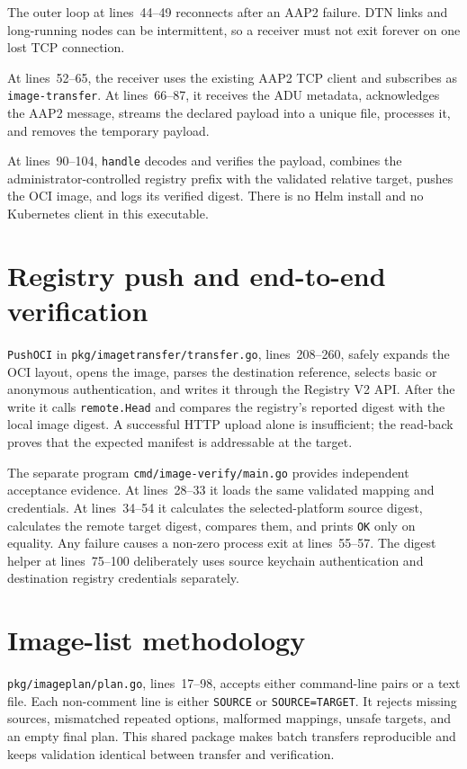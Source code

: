 \documentclass[11pt,a4paper]{article}
\newcommand{\file}[1]{\texttt{#1}}
\newcommand{\lines}[1]{lines~#1}
\begin{document}
The outer loop at \lines{44--49} reconnects after an AAP2 failure. DTN links
and long-running nodes can be intermittent, so a receiver must not exit forever
on one lost TCP connection.

At \lines{52--65}, the receiver uses the existing AAP2 TCP client and
subscribes as \file{image-transfer}. At \lines{66--87}, it receives the ADU
metadata, acknowledges the AAP2 message, streams the declared payload into a
unique file, processes it, and removes the temporary payload.

At \lines{90--104}, \file{handle} decodes and verifies the payload, combines
the administrator-controlled registry prefix with the validated relative
target, pushes the OCI image, and logs its verified digest. There is no Helm
install and no Kubernetes client in this executable.

\section{Registry push and end-to-end verification}
\file{PushOCI} in \file{pkg/imagetransfer/transfer.go}, \lines{208--260}, safely expands the OCI
layout, opens the image, parses the destination reference, selects basic or
anonymous authentication, and writes it through the Registry V2 API. After the
write it calls \file{remote.Head} and compares the registry's reported digest
with the local image digest. A successful HTTP upload alone is insufficient;
the read-back proves that the expected manifest is addressable at the target.

The separate program \file{cmd/image-verify/main.go} provides independent
acceptance evidence. At \lines{28--33} it loads the same validated mapping and
credentials. At \lines{34--54} it calculates the selected-platform source
digest, calculates the remote target digest, compares them, and prints
\file{OK} only on equality. Any failure causes a non-zero process exit at
\lines{55--57}. The digest helper at \lines{75--100} deliberately uses source
keychain authentication and destination registry credentials separately.

\section{Image-list methodology}
\file{pkg/imageplan/plan.go}, \lines{17--98}, accepts either command-line pairs or a text file.
Each non-comment line is either \file{SOURCE} or \file{SOURCE=TARGET}. It
rejects missing sources, mismatched repeated options, malformed mappings,
unsafe targets, and an empty final plan. This shared package makes batch
transfers reproducible and keeps validation identical between transfer and
verification.
\end{document}
